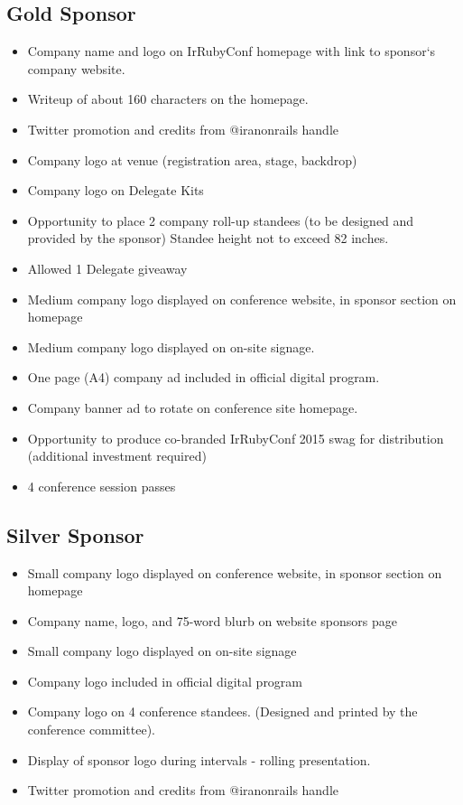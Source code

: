 \documentclass[a4paper,12pt]{article}
\begin{document}
\subsection*{Gold Sponsor}
\begin{itemize}

\item{Company name and logo on IrRubyConf homepage with link to sponsor`s
  company website.
}
\item{Writeup of about 160 characters on the homepage.}

\item{Twitter promotion and credits from @iranonrails handle}
\item{Company logo at venue (registration area, stage, backdrop)}
\item{Company logo on Delegate Kits}
\item{Opportunity to place 2 company roll-up standees (to be designed and
  provided by the sponsor) Standee height not to exceed 82 inches.}
\item{Allowed 1 Delegate giveaway}
\item{Medium company logo displayed on conference website, in sponsor section on homepage}
\item{Medium company logo displayed on on-site signage.}
\item{One page (A4) company ad included in official digital program.}
\item{Company banner ad to rotate on conference site homepage.}
\item{Opportunity to produce co-branded IrRubyConf 2015 swag for distribution (additional
  investment required)}
\item{4 conference session passes}

\end{itemize}


\subsection*{Silver Sponsor}
\label{subsec:label}
\begin{itemize}
\item{Small company logo displayed on conference website, in sponsor section on homepage}
\item{Company name, logo, and 75-word blurb on website sponsors page}
\item{Small company logo displayed on on-site signage}

\item{Company logo included in official digital program}
\item{Company logo on 4 conference standees. (Designed and printed by the conference committee).}
\item{Display of sponsor logo during intervals - rolling presentation.}
\item{Twitter promotion and credits from @iranonrails handle}

\end{itemize}
\end{document}
